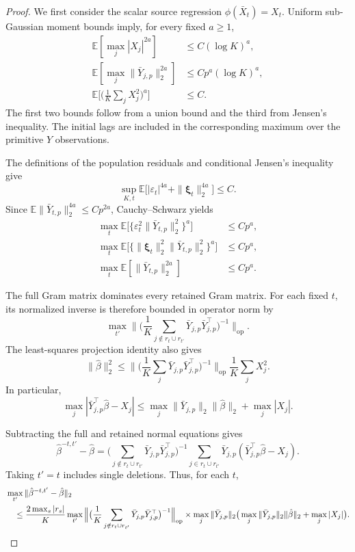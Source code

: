 \documentclass[12pt]{article}
\def\E{\mathbb{E}}
\numberwithin{equation}{section}
\begin{document}
\begin{proof}
We first consider the scalar source regression
$\phi(\bar X_t)=X_t$.
Uniform sub-Gaussian moment bounds imply, for every fixed
$a\geq1$,
\begin{equation}
\label{eq:linear-weighted-max-moments}
\begin{aligned}
\E[\max_j|X_j|^{2a}]
&\leq C(\log K)^a,\\
\E[\max_j\|\bar Y_{j,p}\|_2^{2a}]
&\leq Cp^a(\log K)^a,\\
\E\big[
\big(
\frac1K\sum_jX_j^2
\big)^a
\big]
&\leq C.
\end{aligned}
\end{equation}
The first two bounds follow from a union bound and the third
from Jensen's inequality.
The initial lags are included in the corresponding maximum
over the primitive $Y$ observations.

The definitions of the population residuals and conditional
Jensen's inequality give
\[
\sup_{K,t}
\E\big[
|\varepsilon_t|^{4a}
+\|\boldsymbol\xi_t\|_2^{4a}
\big]\leq C.
\]
Since
$\E\|\bar Y_{t,p}\|_2^{4a}\leq Cp^{2a}$,
Cauchy--Schwarz yields
\begin{equation}
\label{eq:linear-weighted-evaluation-moments}
\begin{aligned}
\max_t
\E\big[
\{\varepsilon_t^2\|\bar Y_{t,p}\|_2^2\}^a
\big]
&\leq Cp^a,\\
\max_t
\E\big[
\{\|\boldsymbol\xi_t\|_2^2
\|\bar Y_{t,p}\|_2^2\}^a
\big]
&\leq Cp^a,\\
\max_t\E[\|\bar Y_{t,p}\|_2^{2a}]
&\leq Cp^a.
\end{aligned}
\end{equation}

The full Gram matrix dominates every retained Gram matrix.
For each fixed $t$, its normalized inverse is therefore
bounded in operator norm by
\[
\max_{t'}
\Big\|
\big(
\frac1K
\sum_{j\notin r_t\cup r_{t'}}
\bar Y_{j,p}\bar Y_{j,p}^\top
\big)^{-1}
\Big\|_{\mathrm{op}}.
\]
The least-squares projection identity also gives
\begin{equation}
\label{eq:linear-weighted-beta-bound}
\|\hat\beta\|_2^2
\leq
\Big\|
\big(
\frac1K\sum_j
\bar Y_{j,p}\bar Y_{j,p}^\top
\big)^{-1}
\Big\|_{\mathrm{op}}
\frac1K\sum_jX_j^2.
\end{equation}
In particular,
\[
\max_j|\bar Y_{j,p}^\top\hat\beta-X_j|
\leq
\max_j\|\bar Y_{j,p}\|_2\|\hat\beta\|_2
+\max_j|X_j|.
\]

Subtracting the full and retained normal equations gives
\[
\hat\beta^{-t,t'}-\hat\beta
=
\big(
\sum_{j\notin r_t\cup r_{t'}}
\bar Y_{j,p}\bar Y_{j,p}^\top
\big)^{-1}
\sum_{j\in r_t\cup r_{t'}}
\bar Y_{j,p}
(\bar Y_{j,p}^\top\hat\beta-X_j).
\]
Taking $t'=t$ includes single deletions.
Thus, for each $t$,
\begin{align}
&\max_{t'}
\|\hat\beta^{-t,t'}-\hat\beta\|_2
\notag\\
&\quad\leq
\frac{2\max_s|r_s|}{K}
\max_{t'}
\Big\|
\big(
\frac1K
\sum_{j\notin r_t\cup r_{t'}}
\bar Y_{j,p}\bar Y_{j,p}^\top
\big)^{-1}
\Big\|_{\mathrm{op}}
\times
\max_j\|\bar Y_{j,p}\|_2
\big(
\max_j\|\bar Y_{j,p}\|_2\|\hat\beta\|_2
+\max_j|X_j|
\big).
\label{eq:linear-weighted-coefficient-bound}
\end{align}


\end{proof}
\end{document}
